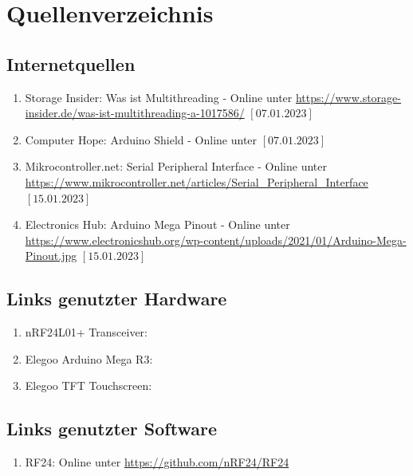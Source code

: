 \documentclass[a4paper, 11pt]{scrartcl}
\begin{document}
\section{Quellenverzeichnis}
\subsection{Internetquellen}
\begin{enumerate}
    \item Storage Insider: Was ist Multithreading - Online unter \url{https://www.storage-insider.de/was-ist-multithreading-a-1017586/} $\left[\text{07.01.2023}\right]$ \label{itm:multithread}
    \item Computer Hope: Arduino Shield - Online unter \url{} $\left[\text{07.01.2023}\right]$ \label{itm:shield}
    \item Mikrocontroller.net: Serial Peripheral Interface - Online unter \url{https://www.mikrocontroller.net/articles/Serial_Peripheral_Interface} $\left[\text{15.01.2023}\right]$ \label{itm:SPI}
    \item Electronics Hub: Arduino Mega Pinout - Online unter \url{https://www.electronicshub.org/wp-content/uploads/2021/01/Arduino-Mega-Pinout.jpg} $\left[\text{15.01.2023}\right]$ \label{itm:pinout}
\end{enumerate}

\subsection{Links genutzter Hardware}\label{ch:hardwarelinks}
\begin{enumerate}
    \item nRF24L01+ Transceiver: \url{}\label{itm:transceiverlink}
    \item Elegoo Arduino Mega R3: \url{}\label{itm:arduinolink}
    \item Elegoo TFT Touchscreen: \url{}\label{itm:tftlink}
\end{enumerate}

\subsection{Links genutzter Software}\label{ch:softwarelinks}
\begin{enumerate}
    \item RF24: Online unter \url{https://github.com/nRF24/RF24}\label{link:rf24}
\end{enumerate}
\end{document}
